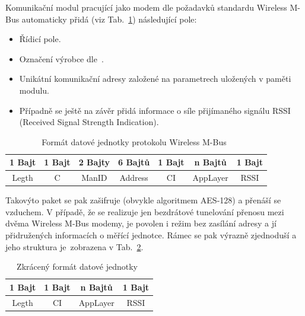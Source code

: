Komunikační modul pracující jako modem dle požadavků standardu Wireless M-Bus automaticky přidá (viz Tab.~\ref{PaketWm2}) následující pole:

\begin{itemize}
	\item Řídicí pole.
\item Označení výrobce dle~\cite{WmbusVendors}.
\item Unikátní komunikační adresy založené na parametrech uložených v paměti modulu.
\item Případně se ještě na závěr přidá informace o síle přijímaného signálu RSSI (Received Signal Strength Indication).
\end{itemize}



\begin{table}[!ht]
\centering
\begin{tabular}{ccccccc}
1 Bajt & 1 Bajt & 2 Bajty & 6 Bajtů & 1 Bajt & n Bajtů & 1 Bajt \\ \hline
\multicolumn{1}{|c|}{Legth} & \multicolumn{1}{c|}{C} & \multicolumn{1}{c|}{ManID} & \multicolumn{1}{c|}{Address} & \multicolumn{1}{c|}{CI} & \multicolumn{1}{c|}{AppLayer} & \multicolumn{1}{c|}{RSSI} \\ \hline
\end{tabular}
\caption{Formát datové jednotky protokolu Wireless M-Bus~\cite{FormatDatoveJednotky}}
\label{PaketWm2}
\vspace{-5pt}
\end{table}

Takovýto paket se pak zašifruje (obvykle algoritmem AES-128) a přenáší se vzduchem. V případě, že se realizuje jen bezdrátové tunelování přenosu mezi dvěma Wireless M-Bus modemy, je povolen i režim bez zasílání adresy a jí přidružených informacích o měřící jednotce. Rámec se pak výrazně zjednoduší a jeho struktura je~zobrazena v Tab.~\ref{PaketWm3}.

			
			\begin{table}[!ht]
			\vspace{-10pt}
\centering
\begin{tabular}{cccc}
1 Bajt & 1 Bajt & n Bajtů & 1 Bajt \\ \hline
\multicolumn{1}{|c|}{Legth} & \multicolumn{1}{c|}{CI} & \multicolumn{1}{c|}{AppLayer} & \multicolumn{1}{c|}{RSSI} \\ \hline
\end{tabular}
\caption{Zkrácený formát datové jednotky~\cite{FormatDatoveJednotky}}
\label{PaketWm3}
\vspace{-20pt}
\end{table}
			
